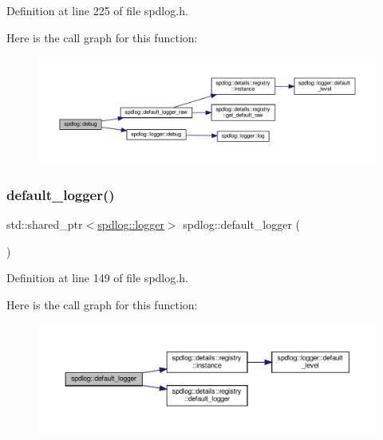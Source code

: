 Definition at line 225 of file spdlog.\+h.

Here is the call graph for this function\+:
\nopagebreak
\begin{figure}[H]
\begin{center}
\leavevmode
\includegraphics[width=350pt]{namespacespdlog_a93c284cebdb3b3dab204f2a87344e4b5_cgraph}
\end{center}
\end{figure}
\mbox{\label{namespacespdlog_a9e6a16853c325306188a7f6f642eba94}} 
\subsubsection{\texorpdfstring{default\+\_\+logger()}{default\_logger()}}
{\footnotesize\ttfamily std\+::shared\+\_\+ptr$<$\hyperlink{classspdlog_1_1logger}{spdlog\+::logger}$>$ spdlog\+::default\+\_\+logger (\begin{DoxyParamCaption}{ }\end{DoxyParamCaption})\hspace{0.3cm}{\ttfamily [inline]}}



Definition at line 149 of file spdlog.\+h.

Here is the call graph for this function\+:
\nopagebreak
\begin{figure}[H]
\begin{center}
\leavevmode
\includegraphics[width=350pt]{namespacespdlog_a9e6a16853c325306188a7f6f642eba94_cgraph}
\end{center}
\end{figure}
\mbox{\label{namespacespdlog_a2c623c9fadba3efc09b48dac8a3990be}} 
